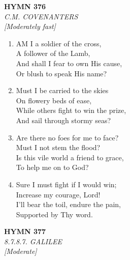 \newpage
\begin{center}
    {\Large \textbf{HYMN 376}}
    \\
    \textit{C.M. COVENANTERS}
    \\
    \textit{\small [Moderately fast]}
\end{center}
\vspace{1em}

\begin{enumerate}
    \item AM I a soldier of the cross, \\
        A follower of the Lamb, \\
        And shall I fear to own His cause, \\
        Or blush to speak His name?

    \item Must I be carried to the skies \\
        On flowery beds of ease, \\
        While others fight to win the prize, \\
        And sail through stormy seas?

    \item Are there no foes for me to face? \\
        Must I not stem the flood? \\
        Is this vile world a friend to grace, \\
        To help me on to God?

    \item Sure I must fight if I would win; \\
        Increase my courage, Lord! \\
        I'll bear the toil, endure the pain, \\
        Supported by Thy word.

\end{enumerate}

\newpage
\begin{center}
    {\Large \textbf{HYMN 377}}
    \\
    \textit{8.7.8.7. GALILEE}
    \\
    \textit{\small [Moderate]}
\end{center}
\vspace{1em}

